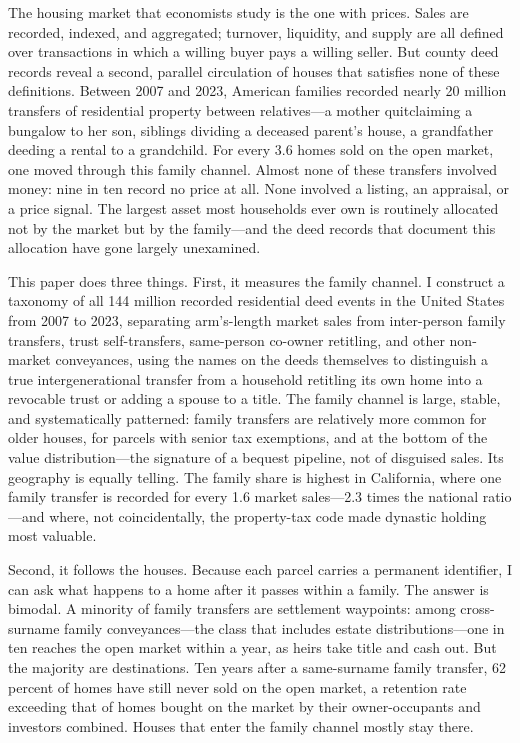 \documentclass[12pt, letterpaper]{article}
\begin{document}
The housing market that economists study is the one with prices. Sales are
recorded, indexed, and aggregated; turnover, liquidity, and supply are all
defined over transactions in which a willing buyer pays a willing seller.
But county deed records reveal a second, parallel circulation of houses that
satisfies none of these definitions. Between 2007 and 2023, American families
recorded nearly 20 million transfers of residential property between
relatives---a mother quitclaiming a bungalow to her son, siblings dividing a
deceased parent's house, a grandfather deeding a rental to a grandchild. For
every 3.6 homes sold on the open market, one moved through this family
channel. Almost none of these transfers involved money: nine in ten record
no price at all. None involved a listing, an appraisal, or a price signal.
The largest asset most households ever own is routinely allocated not by the
market but by the family---and the deed records that document this
allocation have gone largely unexamined.

This paper does three things. First, it measures the family channel. I
construct a taxonomy of all 144 million recorded residential deed events in
the United States from 2007 to 2023, separating arm's-length market sales
from inter-person family transfers, trust self-transfers, same-person
co-owner retitling, and other non-market conveyances, using the names on the
deeds themselves to distinguish a true intergenerational transfer from a
household retitling its own home into a revocable trust or adding a spouse
to a title. The family channel is large, stable, and systematically
patterned: family transfers are relatively more common for older houses, for
parcels with senior tax exemptions, and at the bottom of the value
distribution---the signature of a bequest pipeline, not of disguised sales.
Its geography is equally telling. The family share is highest in California,
where one family transfer is recorded for every 1.6 market sales---2.3 times
the national ratio---and where, not coincidentally, the property-tax code
made dynastic holding most valuable.

Second, it follows the houses. Because each parcel carries a permanent
identifier, I can ask what happens to a home after it passes within a family.
The answer is bimodal. A minority of family transfers are settlement
waypoints: among cross-surname family conveyances---the class that includes
estate distributions---one in ten reaches the open market within a year, as
heirs take title and cash out. But the majority are destinations. Ten years
after a same-surname family transfer, 62 percent of homes have still never
sold on the open market, a retention rate exceeding that of homes bought on
the market by their owner-occupants and investors combined. Houses that enter
the family channel mostly stay there.
\end{document}
